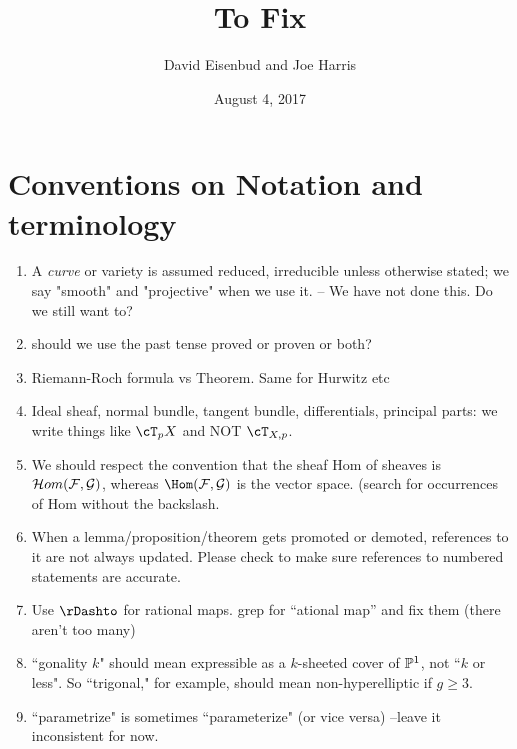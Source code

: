 \documentclass[12pt, leqno]{book}
\date{August 4, 2017}
\title{To Fix}
\author{David Eisenbud and Joe Harris }
\begin{document}
\maketitle

\setlength{\parskip}{5pt}

 
 \section{Conventions on Notation and terminology}
\begin{enumerate}

\item A \emph{curve} or variety is assumed  reduced, irreducible unless otherwise stated; we say "smooth" and "projective" when we use it. -- We have not done this. Do we still want to?

\item should we use the past tense proved or proven or both?

\item Riemann-Roch formula vs Theorem. Same for Hurwitz etc

\item Ideal sheaf, normal bundle, tangent bundle, differentials, principal parts: we write things like 
$\cT_{p}X$ and NOT $\cT_{X,p}$.  

\item We should respect the convention that the sheaf Hom of sheaves is
$\cH om(\cF,\cG)$, whereas $\Hom(\cF,\cG)$ is the vector space. (search for occurrences of Hom without the backslash.

\item When a lemma/proposition/theorem gets promoted or demoted, references to it are not always updated. Please check to make sure references to numbered statements are accurate. 

\item Use $\rDashto$ for rational maps. grep for ``ational map'' and fix them (there aren't too many) 

\item ``gonality $k$" should mean expressible as a $k$-sheeted cover of $\PP^1$, not ``$k$ or less". So ``trigonal," for example, should mean non-hyperelliptic if $g \geq 3$.

\item ``parametrize" is sometimes ``parameterize" (or vice versa) --leave it inconsistent for now.

\end{enumerate}
\end{document}
